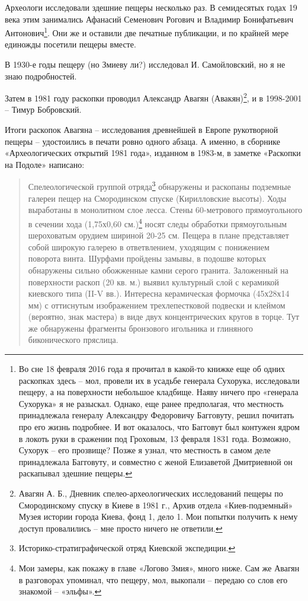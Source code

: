 Археологи исследовали здешние пещеры несколько раз. В семидесятых годах 19 века этим занимались Афанасий Семенович Рогович и Владимир Бонифатьевич Антонович\footnote{Во сне 18 февраля 2016 года я прочитал в какой-то книжке еще об одних раскопках здесь – мол, провели их в усадьбе генерала Сухорука, исследовали пещеру, а на поверхности небольшое кладбище. Наяву ничего про «генерала Сухорука» я не разыскал. Однако, еще ранее предполагая, что местность принадлежала генералу Александру Федоровичу Багговуту, решил почитать про его жизнь подробнее. И вот оказалось, что Багговут был контужен ядром в локоть руки в сражении под Гроховым, 13 февраля 1831 года. Возможно, Сухорук – его прозвище? Позже я узнал, что местность в самом деле принадлежала Багговуту, и совместно с женой Елизаветой Дмитриевной он раскапывал здешние пещеры.}. Они же и оставили две печатные публикации, и по крайней мере единожды посетили пещеры вместе.

В 1930-е годы пещеру (но Змиеву ли?) исследовал И. Самойловский, но я не знаю подробностей.

Затем в 1981 году раскопки проводил Александр Авагян (Авакян)\footnote{Авагян А. Б., Дневник спелео-археологических исследований пещеры по Смородинскому спуску в Киеве в 1981 г., Архив отдела «Киев-подземный» Музея истории города Киева, фонд 1, дело 1. Мои попытки получить к нему доступ провалились – мне просто ничего не ответили.}, и в 1998-2001 – Тимур Бобровский. 

Итоги раскопок Авагяна – исследования древнейшей в Европе рукотворной пещеры – удостоились в печати ровно одного абзаца. А именно, в сборнике «Археологических открытий 1981 года», изданном в 1983-м, в заметке «Раскопки на Подоле» написано:

\begin{quotation}
Спелеологической группой отряда\footnote{Историко-стратиграфической отряд Киевской экспедиции.} обнаружены и раскопаны подземные галереи пещер на Смородинском спуске (Кирилловские высоты). Ходы выработаны в монолитном слое лесса. Стены 60-метрового прямоугольного в сечении хода (1,75х0,60 см.)\footnote{Мои замеры, как покажу в главе «Логово Змия», много ниже. Сам же Авагян в разговорах упоминал, что пещеру, мол, выкопали – передаю со слов его знакомой – «эльфы».} носят следы обработки прямоугольным шероховатым орудием шириной 20-25 см. Пещера в плане представляет собой широкую галерею в ответвлением, уходящим с понижением поворота винта. Шурфами пройдены замывы, в подошве которых обнаружены сильно обожженные камни серого гранита. Заложенный на поверхности раскоп (20 кв. м.) выявил культурный слой с керамикой киевского типа (II-V вв.). Интересна керамическая формочка (45х28х14 мм) с оттиснутым изображением трехлепестковой подвески и клеймом (вероятно, знак мастера) в виде двух концентрических кругов в торце. Тут же обнаружены фрагменты бронзового игольника и глиняного биконического пряслица.
\end{quotation}

